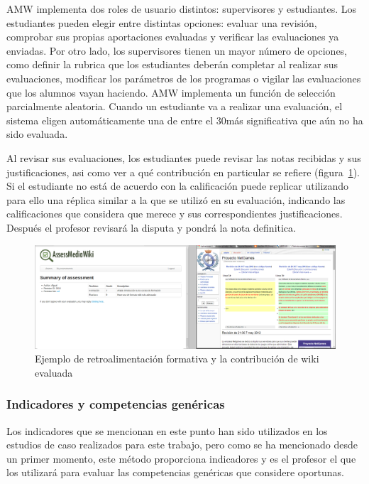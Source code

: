 AMW implementa dos roles de usuario distintos: supervisores y estudiantes. Los estudiantes pueden elegir entre distintas opciones: evaluar una revisión, comprobar sus propias aportaciones evaluadas y verificar las evaluaciones ya enviadas. Por otro lado, los supervisores tienen un mayor número de opciones, como definir la rubrica que los estudiantes deberán completar al realizar sus evaluaciones, modificar los parámetros de los programas o vigilar las evaluaciones que los alumnos vayan haciendo. AMW implementa un función de selección parcialmente aleatoria. Cuando un estudiante va a realizar una evaluación, el sistema eligen automáticamente una de entre el 30\percentage más significativa que aún no ha sido evaluada.

Al revisar sus evaluaciones, los estudiantes puede revisar las notas recibidas y sus justificaciones, asi como ver a qué contribución en particular se refiere (figura~\ref{fig:AmwFormative}). Si el estudiante no está de acuerdo con la calificación puede replicar utilizando para ello una réplica similar a la que se utilizó en su evaluación, indicando las calificaciones que considera que merece y sus correspondientes justificaciones. Después el profesor revisará la disputa y pondrá la nota definitica.

\begin{figure}
  \begin{center}
    \includegraphics[scale=0.19]{AmwFormative.png}
  \end{center}
  \caption{Ejemplo de retroalimentación formativa y la contribución de wiki evaluada}
  \label{fig:AmwFormative}
\end{figure}

\subsubsection{Indicadores y competencias genéricas}

Los indicadores que se mencionan en este punto han sido utilizados en los estudios de caso realizados para este trabajo, pero como se ha mencionado desde un primer momento, este método proporciona indicadores y es el profesor el que los utilizará para evaluar las competencias genéricas que considere oportunas.

